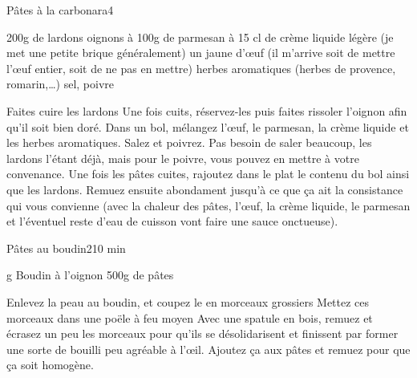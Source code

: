 \begin{recette}{Pâtes à la carbonara}{4}{}{}
\begin{ingredients}
\ingredient 200g de lardons
 oignons
 à 100g de parmesan
 à 15 cl de crème liquide légère (je met une petite brique généralement)
\ingredient un jaune d'œuf (il m'arrive soit de mettre l'œuf entier, soit de ne pas en mettre)
\ingredient herbes aromatiques (herbes de provence, romarin,\dots)
\ingredient sel, poivre
\end{ingredients}

\begin{preparation}
\etape Faites cuire les lardons
\etape Une fois cuits, réservez-les puis faites rissoler l'oignon afin qu'il soit bien doré.
\etape Dans un bol, mélangez l'œuf, le parmesan, la crème liquide et les herbes aromatiques. Salez et poivrez. Pas besoin de saler beaucoup, les lardons l'étant déjà, mais pour le poivre, vous pouvez en mettre à votre convenance.
\etape Une fois les pâtes cuites, rajoutez dans le plat le contenu du bol ainsi que les lardons. Remuez ensuite abondament jusqu'à ce que ça ait la consistance qui vous convienne (avec la chaleur des pâtes, l'œuf, la crème liquide, le parmesan et l'éventuel reste d'eau de cuisson vont faire une sauce onctueuse).
\end{preparation}

\end{recette}

\begin{recette}{Pâtes au boudin}{2}{10 min}{}
\begin{ingredients}
 g Boudin à l'oignon
\ingredient 500g de pâtes
\end{ingredients}

\begin{preparation}
\etape Enlevez la peau au boudin, et coupez le en morceaux grossiers
\etape Mettez ces morceaux dans une poële à feu moyen
\etape Avec une spatule en bois, remuez et écrasez un peu les morceaux pour qu'ils se désolidarisent et finissent par former une sorte de bouilli peu agréable à l'œil.
\etape Ajoutez ça aux pâtes et remuez pour que ça soit homogène.
\end{preparation}

\end{recette}

